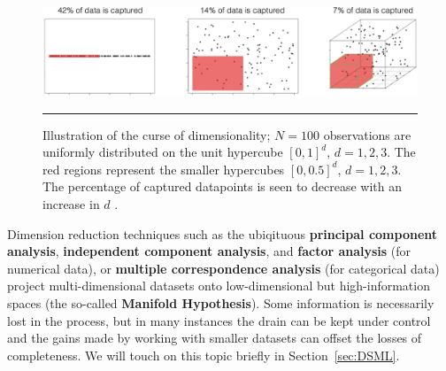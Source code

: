 \begin{figure}[t]
\centering
\includegraphics[width=\textwidth]{Images/COD.png}\caption[\small Illustration of the curse of dimensionality]{\small Illustration of the curse of dimensionality; $N=100$ observations are uniformly distributed on the unit hypercube $[0,1]^d$, $d=1, 2, 3$. The red regions represent the smaller hypercubes $[0,0.5]^d$, $d=1,2,3$. The percentage of captured datapoints is seen to decrease with an increase in $d$ \cite{DP_SS}.} \label{fig:COD}\hrule
\end{figure}
\afterpage{\FloatBarrier}
Dimension reduction techniques such as the ubiqituous \textbf{principal component analysis}, \textbf{independent component analysis}, and \textbf{factor analysis} (for numerical data), or \textbf{multiple correspondence analysis} (for categorical data) project multi-dimensional datasets onto low-dimensional but high-information spaces (the so-called \textbf{Manifold Hypothesis}). Some information is necessarily lost in the process, but in many instances the drain can be kept under control and the gains made by working with smaller datasets can offset the losses of completeness. We will touch on this topic briefly in Section~\ref{sec:DSML}.
